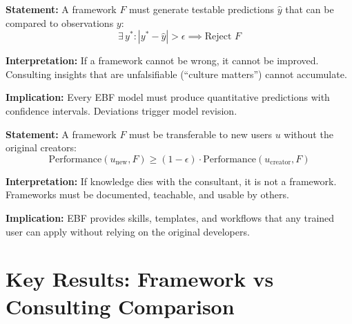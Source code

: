 \begin{tcolorbox}[colback=gray!5!white, colframe=gray!75!black,
    title=Axiom UNMAPPED_FM-4: Falsifiability Requirement]
\textbf{Statement:} A framework $F$ must generate testable predictions $\hat{y}$ that can be compared to observations $y$:
\begin{equation}
\exists \, y^* : |y^* - \hat{y}| > \epsilon \implies \text{Reject } F
\end{equation}

\textbf{Interpretation:} If a framework cannot be wrong, it cannot be improved. Consulting insights that are unfalsifiable (``culture matters'') cannot accumulate.

\textbf{Implication:} Every EBF model must produce quantitative predictions with confidence intervals. Deviations trigger model revision.
\end{tcolorbox}

\begin{tcolorbox}[colback=gray!5!white, colframe=gray!75!black,
    title=Axiom UNMAPPED_FM-5: Transferability Principle]
\textbf{Statement:} A framework $F$ must be transferable to new users $u$ without the original creators:
\begin{equation}
\text{Performance}(u_{\text{new}}, F) \geq (1 - \epsilon) \cdot \text{Performance}(u_{\text{creator}}, F)
\end{equation}

\textbf{Interpretation:} If knowledge dies with the consultant, it is not a framework. Frameworks must be documented, teachable, and usable by others.

\textbf{Implication:} EBF provides skills, templates, and workflows that any trained user can apply without relying on the original developers.
\end{tcolorbox}


\section{Key Results: Framework vs Consulting Comparison}
\label{sec:fm-comparison}

